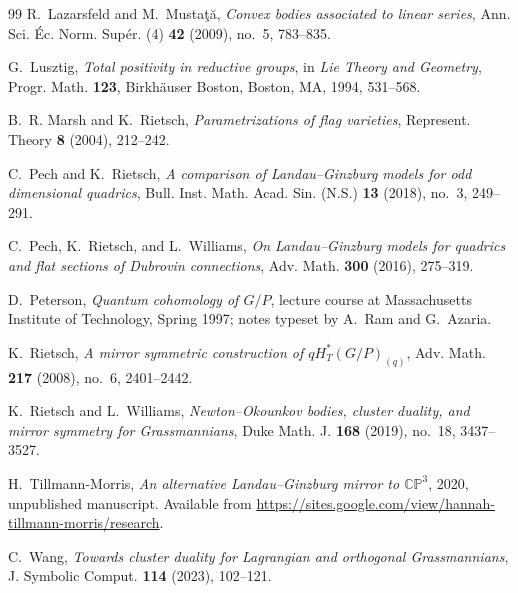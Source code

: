\documentclass{article}
\begin{document}
\begin{thebibliography}{99}
R.~Lazarsfeld and M.~Musta\c{t}\u{a},
\emph{Convex bodies associated to linear series},
Ann. Sci. \'Ec. Norm. Sup\'er. (4) \textbf{42} (2009), no.~5, 783--835.

G.~Lusztig,
\emph{Total positivity in reductive groups},
in \emph{Lie Theory and Geometry}, Progr. Math. \textbf{123},
Birkh\"auser Boston, Boston, MA, 1994, 531--568.

B.~R. Marsh and K.~Rietsch,
\emph{Parametrizations of flag varieties},
Represent. Theory \textbf{8} (2004), 212--242.

C.~Pech and K.~Rietsch,
\emph{A comparison of Landau--Ginzburg models for odd dimensional quadrics},
Bull. Inst. Math. Acad. Sin. (N.S.) \textbf{13} (2018), no.~3, 249--291.

C.~Pech, K.~Rietsch, and L.~Williams,
\emph{On Landau--Ginzburg models for quadrics and flat sections of Dubrovin connections},
Adv. Math. \textbf{300} (2016), 275--319.

D.~Peterson,
\emph{Quantum cohomology of \(G/P\)},
lecture course at Massachusetts Institute of Technology, Spring 1997;
notes typeset by A.~Ram and G.~Azaria.

K.~Rietsch,
\emph{A mirror symmetric construction of \(qH_T^*(G/P)_{(q)}\)},
Adv. Math. \textbf{217} (2008), no.~6, 2401--2442.

K.~Rietsch and L.~Williams,
\emph{Newton--Okounkov bodies, cluster duality, and mirror symmetry for Grassmannians},
Duke Math. J. \textbf{168} (2019), no.~18, 3437--3527.

H.~Tillmann-Morris,
\emph{An alternative Landau--Ginzburg mirror to \(\mathbb{CP}^3\)},
2020, unpublished manuscript. Available from
\url{https://sites.google.com/view/hannah-tillmann-morris/research}.

C.~Wang,
\emph{Towards cluster duality for Lagrangian and orthogonal Grassmannians},
J. Symbolic Comput. \textbf{114} (2023), 102--121.

\end{thebibliography}
\end{document}
